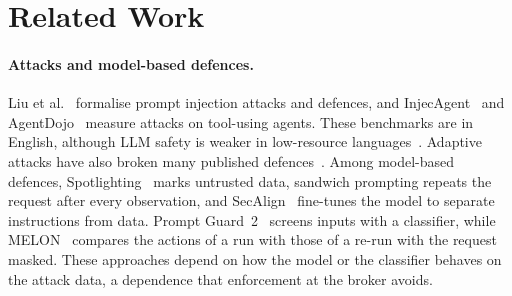 \section{Related Work}\label{sec:related}

\paragraph{Attacks and model-based defences.} Liu et al.~\cite{liu2024formalizing} formalise prompt injection attacks
and defences, and InjecAgent~\cite{zhan2024injecagent} and AgentDojo~\cite{debenedetti2024agentdojo} measure attacks on
tool-using agents. These benchmarks are in English, although LLM safety is weaker in low-resource
languages~\cite{deng2024multijail}. Adaptive attacks have also broken many published defences~\cite{zhan2025adaptive}.
Among model-based defences, Spotlighting~\cite{hines2024spotlighting} marks untrusted data, sandwich prompting repeats
the request after every observation, and SecAlign~\cite{chen2025secalign} fine-tunes the model to separate instructions
from data. Prompt Guard~2~\cite{meta2025promptguard2} screens inputs with a classifier, while MELON~\cite{zhu2025melon}
compares the actions of a run with those of a re-run with the request masked. These approaches depend on how the model
or the classifier behaves on the attack data, a dependence that enforcement at the broker avoids.

